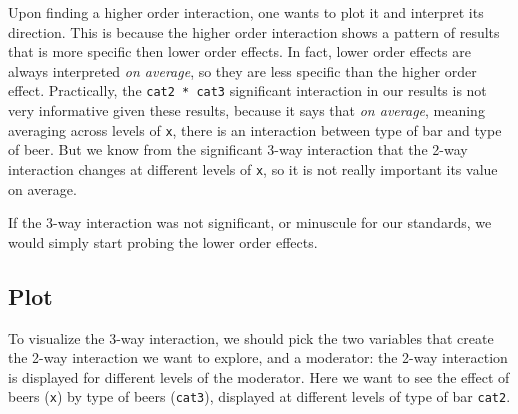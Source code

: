 \documentclass[
]{book}
\begin{document}
Upon finding a higher order interaction, one wants to plot it and interpret its direction. This is because the higher order interaction shows a pattern of results that is more specific then lower order effects. In fact, lower order effects are always interpreted \emph{on average}, so they are less specific than the higher order effect. Practically, the \texttt{cat2\ *\ cat3} significant interaction in our results is not very informative given these results, because it says that \emph{on average}, meaning averaging across levels of \texttt{x}, there is an interaction between type of bar and type of beer. But we know from the significant 3-way interaction that the 2-way interaction changes at different levels of \texttt{x}, so it is not really important its value on average.

If the 3-way interaction was not significant, or minuscule for our standards, we would simply start probing the lower order effects.

\hypertarget{plot}{%
\subsection{Plot}\label{plot}}

To visualize the 3-way interaction, we should pick the two variables that create the 2-way interaction we want to explore, and a moderator: the 2-way interaction is displayed for different levels of the moderator. Here we want to see the effect of beers (\texttt{x}) by type of beers (\texttt{cat3}), displayed at different levels of type of bar \texttt{cat2}.
\end{document}
